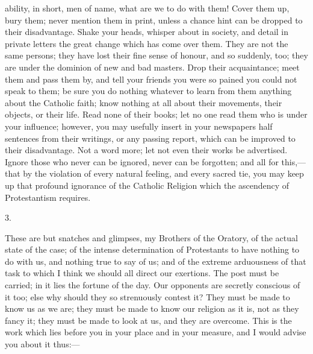 ability, in short, men of name, what are we to do with
them! Cover them up, bury them; never mention them in
print, unless a chance hint can be dropped to their
disadvantage. Shake your heads, whisper about in society,
and detail in private letters the great change which has
come over them. They are not the same persons; they have
lost their fine sense of honour, and so suddenly, too;
they are under the dominion of new and bad masters. Drop
their acquaintance; meet them and pass them by, and tell
your friends you were so pained you could not speak to
them; be sure you do nothing whatever to learn from them
anything about the Catholic faith; know nothing at all
about their movements, their objects, or their life. Read
none of their books; let no one read them who is under
your influence; however, you may usefully insert in your
newspapers half sentences from their writings, or any
passing report, which can be improved to their
disadvantage. Not a word more; let not even their works
be advertised. Ignore those who never can be ignored,
never can be forgotten; and all for this,—that by
the violation of every natural feeling, and every sacred
tie, you may keep up that profound ignorance of the
Catholic Religion which the ascendency of Protestantism
requires.

3.

These are but snatches and glimpses, my Brothers of
the Oratory, of the actual state of the case; of the
intense determination of Protestants to have nothing to
do with us, and nothing true to say of us; and of the
extreme arduousness of that task to which I think we
should all direct our exertions. The post must be
carried; in it lies the fortune of the day. Our opponents
are secretly conscious of it too; else why should they so
strenuously contest it? They must be made to know us as
we are; they must be made to know our religion as it is,
not as they fancy it; they must be made to look at us,
and they are overcome. This is the work which lies before
you in your place and in your measure, and I would advise
you about it thus:—

